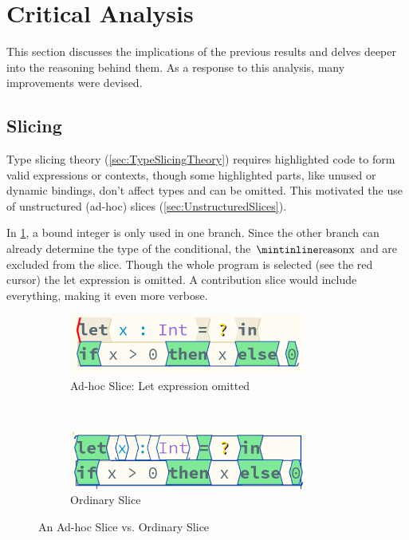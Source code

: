 \section{Critical Analysis}\label{sec:CriticalAnalysis}
This section discusses the implications of the previous results and delves deeper into the reasoning behind them. As a response to this analysis, many improvements were devised.
\subsection{Slicing}\label{sec:SlicingAnalysis}
Type slicing theory (\cref{sec:TypeSlicingTheory}) requires highlighted code to form valid expressions or contexts, though some highlighted parts, like unused or dynamic bindings, don't affect types and can be omitted. This motivated the use of unstructured (ad-hoc) slices (\cref{sec:UnstructuredSlices}).

In \cref{fig:LetSliceOmitted}, a bound integer  is only used in one branch. Since the other branch can already determine the type of the conditional, the $\code{x}$  and  are excluded from the slice. Though the whole program is selected (see the red cursor) the let expression is omitted. A contribution slice would include everything, making it even more verbose.
\begin{figure}
\centering
\begin{subfigure}{0.45\textwidth}
\centering

\includegraphics[width=0.85\textwidth]{Media/Figures/Unused_let}
\caption{Ad-hoc Slice: Let expression omitted}
\end{subfigure}$\qquad$
\begin{subfigure}{0.45\textwidth}
\centering

\includegraphics[width=0.85\textwidth]{Media/Figures/Unused_let_ordinary}
\caption{Ordinary Slice}
\end{subfigure}

\caption{An Ad-hoc Slice vs. Ordinary Slice}
\label{fig:LetSliceOmitted}
\end{figure}


